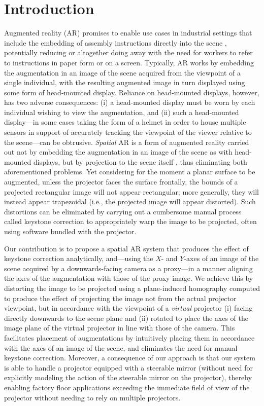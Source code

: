 \documentclass[review]{elsarticle}
\begin{document}
\linenumbers

\section{Introduction}\label{sec:intro}

Augmented reality (AR) \cite{van2010survey,zhou2008trends} promises to enable use cases in industrial settings that include the embedding of assembly instructions directly into the scene \cite{schlund2018moglichkeiten,masood2019augmented,gattullo2019towards}, potentially reducing or altogether doing away with the need for workers to refer to instructions in paper form or on a screen. Typically, AR works by embedding the augmentation in an image of the scene acquired from the viewpoint of a single individual, with the resulting augmented image in turn displayed using some form of head-mounted display. Reliance on head-mounted displays, however, has two adverse consequences: (i) a head-mounted display must be worn by each individual wishing to view the augmentation, and (ii) such a head-mounted display---in some cases taking the form of a helmet in order to house multiple sensors in support of accurately tracking the viewpoint of the viewer relative to the scene---can be obtrusive. \textit{Spatial} AR is a form of augmented reality carried out not by embedding the augmentation in an image of the scene as with head-mounted displays, but by projection to the scene itself \cite{bimber2019spatial}, thus eliminating both aforementioned problems. Yet considering for the moment a planar surface to be augmented, unless the projector faces the surface frontally, the bounds of a projected rectangular image will not appear rectangular; more generally, they will instead appear trapezoidal (i.e., the projected image will appear distorted). Such distortions can be eliminated by carrying out a cumbersome manual process called keystone correction to appropriately warp the image to be projected, often using software bundled with the projector.

Our contribution is to propose a spatial AR system that produces the effect of keystone correction analytically, and---using the $X$- and $Y$-axes of an image of the scene acquired by a downwards-facing camera as a proxy---in a manner aligning the axes of the augmentation with those of the proxy image. We achieve this by distorting the image to be projected using a plane-induced homography computed to produce the effect of projecting the image not from the actual projector viewpoint, but in accordance with the viewpoint of a \textit{virtual} projector (i) facing directly downwards to the scene plane and (ii) rotated to place the axes of the image plane of the virtual projector in line with those of the camera. This facilitates placement of augmentations by intuitively placing them in accordance with the axes of an image of the scene, and eliminates the need for manual keystone correction. Moreover, a consequence of our approach is that our system is able to handle a projector equipped with a steerable mirror (without need for explicitly modeling the action of the steerable mirror on the projector), thereby enabling factory floor applications exceeding the immediate field of view of the projector without needing to rely on multiple projectors.
\end{document}
